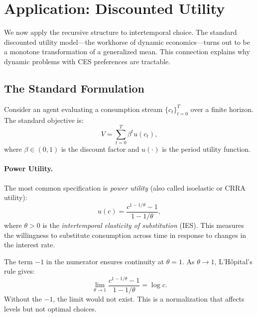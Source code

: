 \section{Application: Discounted Utility}
\label{sec:discounted-utility}

We now apply the recursive structure to intertemporal choice. The standard discounted utility model---the workhorse of dynamic economics---turns out to be a monotone transformation of a generalized mean. This connection explains why dynamic problems with CES preferences are tractable.

\subsection{The Standard Formulation}
\label{subsec:standard-formulation}

Consider an agent evaluating a consumption stream $\{c_t\}_{t=0}^{T}$ over a finite horizon. The standard objective is:
\begin{equation}
V = \sum_{t=0}^{T} \beta^t u(c_t),
\label{eq:standard-objective}
\end{equation}
where $\beta \in (0,1)$ is the discount factor and $u(\cdot)$ is the period utility function.

\paragraph{Power Utility.}
The most common specification is \emph{power utility} (also called isoelastic or CRRA utility):
\begin{equation}
u(c) = \frac{c^{1-1/\theta} - 1}{1 - 1/\theta},
\label{eq:power-utility}
\end{equation}
where $\theta > 0$ is the \emph{intertemporal elasticity of substitution} (IES). This measures the willingness to substitute consumption across time in response to changes in the interest rate.

\begin{calloutnote}
The term $-1$ in the numerator ensures continuity at $\theta = 1$. As $\theta \to 1$, L'H\^opital's rule gives:
\begin{equation}
\lim_{\theta \to 1} \frac{c^{1-1/\theta} - 1}{1 - 1/\theta} = \log c.
\end{equation}
Without the $-1$, the limit would not exist. This is a normalization that affects levels but not optimal choices.
\end{calloutnote}

